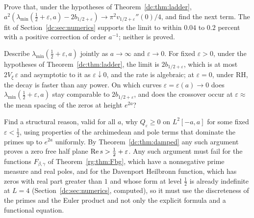 \begin{problem}\label{dc:prob:rate}
Prove that, under the hypotheses of Theorem~\ref{dc:thm:ladder}, $a^2(\lambda_{\min}(\frac12+\varepsilon,a)-2b_{1/2+\varepsilon})\to\pi^2v_{1/2+\varepsilon}''(0)/4$, and find the next term. The fit of Section~\ref{dc:sec:numerics} supports the limit to within $0.04$ to $0.2$ percent with a positive correction of order $a^{-1}$; neither is proved.
\end{problem}

\begin{problem}\label{dc:prob:transition}
Describe $\lambda_{\min}(\frac12+\varepsilon,a)$ jointly as $a\to\infty$ and $\varepsilon\to0$. For fixed $\varepsilon>0$, under the hypotheses of Theorem~\ref{dc:thm:ladder}, the limit is $2b_{1/2+\varepsilon}$, which is at most $2V_\xi\,\varepsilon$ and asymptotic to it as $\varepsilon\downarrow0$, and the rate is algebraic; at $\varepsilon=0$, under RH, the decay is faster than any power. On which curves $\varepsilon=\varepsilon(a)\to0$ does $\lambda_{\min}(\frac12+\varepsilon,a)$ stay comparable to $2b_{1/2+\varepsilon}$, and does the crossover occur at $\varepsilon\approx$ the mean spacing of the zeros at height $e^{2a}$?
\end{problem}

\begin{problem}\label{dc:prob:uniform}
Find a structural reason, valid for all $a$, why $Q_\varepsilon\ge0$ on $L^2[-a,a]$ for some fixed $\varepsilon<\frac12$, using properties of the archimedean and pole terms that dominate the primes up to $e^{2a}$ uniformly. By Theorem~\ref{dc:thm:damped} any such argument proves a zero free half plane $\operatorname{Re} s>\frac12+\varepsilon$. Any such argument must fail for the functions $F_{\beta,\gamma}$ of Theorem~\ref{rg:thm:Fbg}, which have a nonnegative prime measure and real poles, and for the Davenport Heilbronn function, which has zeros with real part greater than $1$ \cite[Section 10.25]{Titchmarsh} and whose form at level $\frac12$ is already indefinite at $L=4$ (Section~\ref{dc:sec:numerics}, computed), so it must use the discreteness of the primes and the Euler product and not only the explicit formula and a functional equation.
\end{problem}

